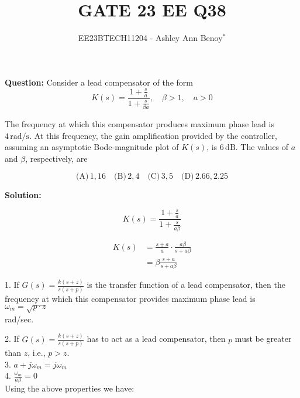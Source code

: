 \documentclass[journal,12pt,twocolumn]{IEEEtran}
\theoremstyle{remark}
\begin{document}
    
    \vspace{3cm}
    
    \title{GATE 23 EE Q38}
    \author{EE23BTECH11204 - Ashley Ann Benoy$^{*}$}%
    \maketitle
    \newpage
    \bigskip
    
    
    
    \textbf{Question: }
    Consider a lead compensator of the form
    \[ K(s) = \frac{1 + \frac{s}{a}}{1 + \frac{s}{\beta a}}, \quad \beta > 1, \quad a > 0 \]
    
    The frequency at which this compensator produces maximum phase lead is \(4 \, \text{rad/s}\). At this frequency, the gain amplification provided by the controller, assuming an asymptotic Bode-magnitude plot of \(K(s)\), is \(6 \, \text{dB}\). The values of \(a\) and \(\beta\), respectively, are
    
    \[
    \text{(A)} \, 1, 16 \quad
    \text{(B)} \, 2, 4 \quad
    \text{(C)} \, 3, 5 \quad
    \text{(D)} \, 2.66, 2.25
    \]
    
    \textbf{Solution:}
    
   
    
    \[ K(s) = \frac{1 + \frac{s}{a}}{1 + \frac{s}{a\beta}} \]
    
    \begin{align}
    K(s) &= \frac{s + a}{a} \cdot \frac{a\beta}{s + a\beta} \\
    &= \beta \frac{s + a}{s + a\beta}
    \end{align}
    
    1. If \(G(s) = \frac{k(s+z)}{s(s+p)}\) is the transfer function of a lead compensator, then the frequency at which this compensator provides maximum phase lead is \(\omega_m = \sqrt{p \cdot z}\)\\ rad/sec.
    
    2. If \(G(s) = \frac{k(s+z)}{s(s+p)}\) has to act as a lead compensator, then \(p\) must be greater than \(z\), i.e., \(p > z\).\\
    
    3. \(a+j\omega_m=j\omega_m\)\\
     
    4. \(\frac{\omega_m}{a\beta}=0\)\\
    
    Using the above properties we have:
    
\end{document}
